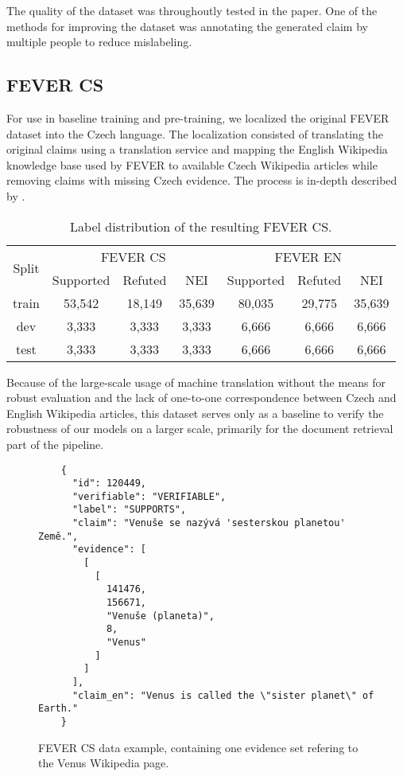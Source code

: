 The quality of the dataset was throughoutly tested in the paper.
One of the methods for improving the dataset was annotating the generated claim by multiple people to reduce mislabeling.

\subsection{FEVER CS}

For use in baseline training and pre-training, we localized the original FEVER dataset into the Czech language. 
The localization consisted of translating the original claims using a translation service and mapping the English Wikipedia knowledge base used by FEVER to available Czech Wikipedia articles while removing claims with missing Czech evidence.
The process is in-depth described by \citet[Chapter 3]{ullrich}.

\begin{table}[h!]
    \centering
    \begin{tabular}{c || c c c || c c c}
        \multirow{2}{0.8cm}{Split} & \multicolumn{3}{c||}{FEVER CS} & \multicolumn{3}{c}{FEVER EN} \\
        & Supported & Refuted & NEI & Supported & Refuted & NEI\\
        \hline
        train & 53,542 & 18,149 & 35,639 & 80,035 & 29,775 & 35,639\\
        dev & 3,333 & 3,333 & 3,333 & 6,666 & 6,666 & 6,666 \\
        test & 3,333 & 3,333 & 3,333 & 6,666 & 6,666 & 6,666
    \end{tabular}
\caption[Fever CS Label Distribution]{Label distribution of the resulting FEVER CS.}
\end{table}

Because of the large-scale usage of machine translation without the means for robust evaluation and the lack of one-to-one correspondence between Czech and English Wikipedia articles, this dataset serves only as a baseline to verify the robustness of our models on a larger scale, primarily for the document retrieval part of the pipeline.

\begin{figure}[h!]
    \begin{framed}
    \begin{verbatim}
    {
      "id": 120449,
      "verifiable": "VERIFIABLE",
      "label": "SUPPORTS",
      "claim": "Venuše se nazývá 'sesterskou planetou' Země.",
      "evidence": [
        [
          [
            141476,
            156671,
            "Venuše (planeta)",
            8,
            "Venus"
          ]
        ]
      ],
      "claim_en": "Venus is called the \"sister planet\" of Earth."
    }\end{verbatim}
    \vspace{-0.4cm}
    \end{framed}
    \caption[FEVER CS Data Example]{FEVER CS data example, containing one evidence set refering to the Venus Wikipedia page.}
    \label{fig:fevercs_example}
\end{figure}

